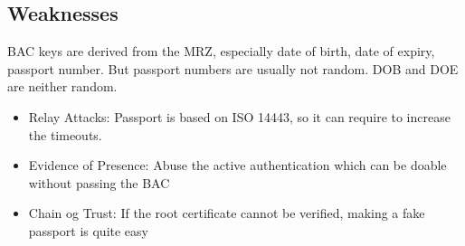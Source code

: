 \subsection{Weaknesses}
BAC keys are derived from the MRZ, especially date of birth, date of expiry,
passport number. But passport numbers are usually not random. DOB and DOE are
neither random.

\begin{itemize}
    \item Relay Attacks: Passport is based on ISO 14443, so it can require to
    increase the timeouts.
    \item Evidence of Presence: Abuse the active authentication which can be
    doable without passing the BAC
    \item Chain og Trust: If the root certificate cannot be verified, making a
    fake passport is quite easy
\end{itemize}

